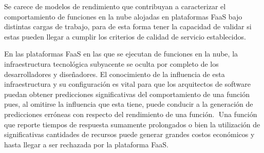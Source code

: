Se carece de modelos de rendimiento que contribuyan a caracterizar el comportamiento de funciones en la nube alojadas en plataformas FaaS bajo distintas cargas de trabajo, para de esta forma tener la capacidad de validar si estas pueden llegar a cumplir los criterios de calidad de servicio establecidos.

En las plataformas FaaS en las que se ejecutan de funciones en la nube, la infraestructura tecnológica subyacente se oculta por completo de los desarrolladores y diseñadores. El conocimiento de la influencia de esta infraestructura y su configuración es vital para que los arquitectos de software puedan obtener predicciones significativas del comportamiento de una función pues, al omitirse la influencia que esta tiene, puede conducir a la generación de predicciones erróneas con respecto del rendimiento de una función. Una función que reporte tiempos de respuesta sumamente prolongados o bien la utilización de significativas cantidades de recursos puede generar grandes costos económicos y hasta llegar a ser rechazada por la plataforma FaaS.

